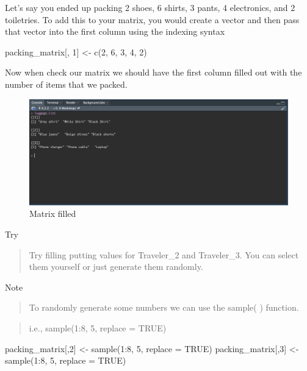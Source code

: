 \documentclass[
]{book}
\newenvironment{Shaded}{\begin{snugshade}}{\end{snugshade}}
\newcommand{\AttributeTok}[1]{\textcolor[rgb]{0.77,0.63,0.00}{#1}}
\newcommand{\ConstantTok}[1]{\textcolor[rgb]{0.00,0.00,0.00}{#1}}
\newcommand{\DecValTok}[1]{\textcolor[rgb]{0.00,0.00,0.81}{#1}}
\newcommand{\FunctionTok}[1]{\textcolor[rgb]{0.00,0.00,0.00}{#1}}
\newcommand{\NormalTok}[1]{#1}
\newcommand{\OtherTok}[1]{\textcolor[rgb]{0.56,0.35,0.01}{#1}}
\newcommand{\SpecialCharTok}[1]{\textcolor[rgb]{0.00,0.00,0.00}{#1}}
\begin{document}
Let's say you ended up packing 2 shoes, 6 shirts, 3 pants, 4 electronics, and 2 toiletries. To add this to your matrix, you would create a vector and then pass that vector into the first column using the indexing syntax

\begin{Shaded}
\begin{Highlighting}[]
\NormalTok{packing\_matrix[, }\DecValTok{1}\NormalTok{] }\OtherTok{\textless{}{-}} \FunctionTok{c}\NormalTok{(}\DecValTok{2}\NormalTok{, }\DecValTok{6}\NormalTok{, }\DecValTok{3}\NormalTok{, }\DecValTok{4}\NormalTok{, }\DecValTok{2}\NormalTok{)}
\end{Highlighting}
\end{Shaded}

Now when check our matrix we should have the first column filled out with the number of items that we packed.

\begin{figure}
\includegraphics[width=29.36in]{images/3.6listconsole} \caption{Matrix filled}\label{fig:unnamed-chunk-19}
\end{figure}

Try

\begin{quote}
Try filling putting values for Traveler\_2 and Traveler\_3. You can select them yourself or just generate them randomly.
\end{quote}

Note

\begin{quote}
To randomly generate some numbers we can use the sample( ) function.
\end{quote}

\begin{quote}
i.e., sample(1:8, 5, replace = TRUE)
\end{quote}

\begin{Shaded}
\begin{Highlighting}[]
\NormalTok{packing\_matrix[,}\DecValTok{2}\NormalTok{] }\OtherTok{\textless{}{-}} \FunctionTok{sample}\NormalTok{(}\DecValTok{1}\SpecialCharTok{:}\DecValTok{8}\NormalTok{, }\DecValTok{5}\NormalTok{, }\AttributeTok{replace =} \ConstantTok{TRUE}\NormalTok{)}
\NormalTok{packing\_matrix[,}\DecValTok{3}\NormalTok{] }\OtherTok{\textless{}{-}} \FunctionTok{sample}\NormalTok{(}\DecValTok{1}\SpecialCharTok{:}\DecValTok{8}\NormalTok{, }\DecValTok{5}\NormalTok{, }\AttributeTok{replace =} \ConstantTok{TRUE}\NormalTok{)}
\end{Highlighting}
\end{Shaded}
\end{document}
